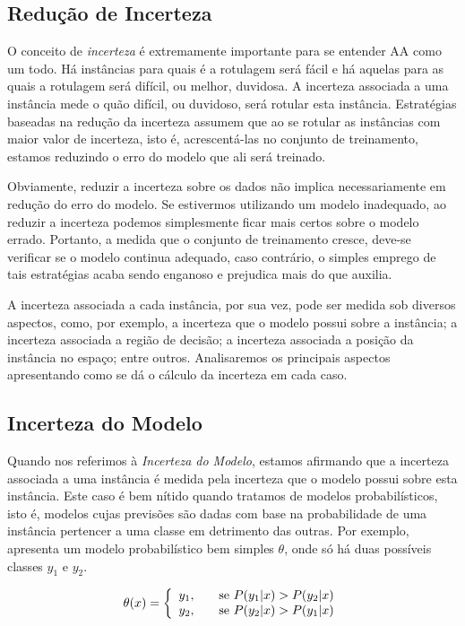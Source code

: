 \subsection{Redução de Incerteza}
O conceito de \textit{incerteza} é extremamente importante para se entender AA como um todo. Há instâncias para quais é a rotulagem será fácil e há aquelas para as quais a rotulagem será difícil, ou melhor, duvidosa. A incerteza associada a uma instância mede o quão difícil, ou duvidoso, será rotular esta instância. Estratégias baseadas na redução da incerteza assumem que ao se rotular as instâncias com maior valor de incerteza, isto é, acrescentá-las no conjunto de treinamento, estamos reduzindo o erro do modelo que ali será treinado. 

Obviamente, reduzir a incerteza sobre os dados não implica necessariamente em redução do erro do modelo. Se estivermos utilizando um modelo inadequado, ao reduzir a incerteza podemos simplesmente ficar mais certos sobre o modelo errado. Portanto, a medida que o conjunto de treinamento cresce, deve-se verificar se o modelo continua adequado, caso contrário, o simples emprego de tais estratégias acaba sendo enganoso e prejudica mais do que auxilia.

A incerteza associada a cada instância, por sua vez, pode ser medida sob diversos aspectos, como, por exemplo, a incerteza que o modelo possui sobre a instância; a incerteza associada a região de decisão; a incerteza associada a posição da instância no espaço; entre outros. Analisaremos os principais aspectos apresentando como se dá o cálculo da incerteza em cada caso.

\subsection{Incerteza do Modelo}
Quando nos referimos à \textit{Incerteza do Modelo}, estamos afirmando que a incerteza associada a uma instância é medida pela incerteza que o modelo possui sobre esta instância. Este caso é bem nítido quando tratamos de modelos probabilísticos, isto é, modelos cujas previsões são dadas com base na probabilidade de uma instância pertencer a uma classe em detrimento das outras. Por exemplo, \citep{settles.tr09} apresenta um modelo probabilístico bem simples $\theta$, onde só há duas possíveis classes $y_1$ e $y_2$.

\begin{equation}
\theta(x) = \left\{ 
  \begin{array}{l l}
    y_1, & \quad \text{se $P(y_1|x) > P(y_2|x)$}\\
    y_2, & \quad \text{se $P(y_2|x) > P(y_1|x)$}
  \end{array} \right.
\label{eq:simple-prob-model}
\end{equation}

